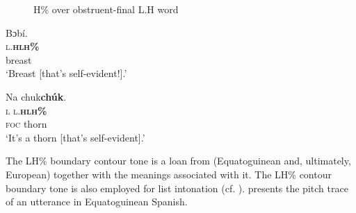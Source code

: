 \begin{figure}
\caption{H\% over obstruent-final L.H word}
\label{fig:key:3.34}
\end{figure}

\ea%
    \label{ex:key:86}
    \glll   Bɔbí.\\
\textsc{l.}\textbf{\textsc{h}}\textbf{\textsc{lh\%}}\\
breast\\
\glt ‘Breast [that’s self-evident!].’ 
\z

\ea
\label{ex:key:87}
\glll Na  chuk\textbf{chúk}.\\
\textsc{l}  \textsc{l.}\textbf{\textsc{hlh\%}}\\
\textsc{foc}  thorn\\
\glt ‘It’s a thorn [that’s self-evident].’
\z

The LH\% boundary contour tone is a loan from (Equatoguinean and, ultimately, European)  together with the meanings associated with it. The LH\% contour boundary tone is also employed for list intonation (cf. ).  presents the pitch trace of an utterance in Equatoguinean Spanish.


